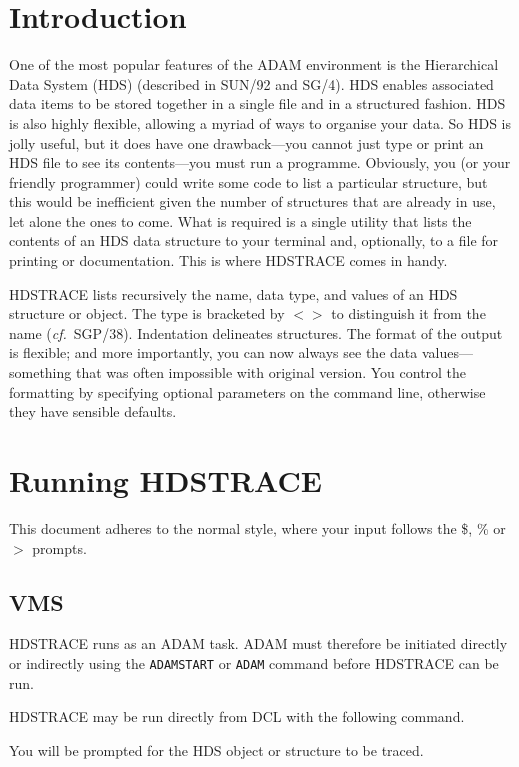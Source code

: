 \documentclass[11pt,nolof]{starlink}
\begin{document}
\scfrontmatter

\section{Introduction}
One of the most popular features of the ADAM environment is the
Hierarchical Data System (HDS) (described in SUN/92 and SG/4).   HDS
enables associated data items to be stored together in a single file and
in a structured fashion.  HDS is also highly flexible, allowing a myriad
of ways to organise your data.  So HDS is jolly useful, but it does have
one drawback---you cannot just type or print an HDS file to see its
contents---you must run a programme.  Obviously, you (or your friendly
programmer) could write some code to list a particular structure, but
this would be inefficient given the number of structures that are
already in use, let alone the ones to come.  What is required is a
single utility that lists the contents of an HDS data structure to your
terminal and, optionally, to a file for printing or documentation. This
is where {\footnotesize HDSTRACE} comes in handy.

{\footnotesize HDSTRACE} lists recursively the name, data type, and
values of an HDS structure or object.  The type is bracketed by $<>$ to
distinguish it from the name (\textit{cf.}\ SGP/38).  Indentation
delineates structures.  The format of the output is flexible; and more
importantly, you can now always see the data values---something that was
often impossible with original version.  You control the formatting by
specifying optional parameters on the command line, otherwise they have
sensible defaults.


\section{Running HDSTRACE}
This document adheres to the normal style, where your input follows
the \$, \% or $>$ prompts.

\subsection{VMS}
{\footnotesize HDSTRACE} runs as an {\footnotesize ADAM} task.
{\footnotesize ADAM} must
therefore be initiated directly or indirectly using the \texttt{ADAMSTART}
or \texttt{ADAM} command before {\footnotesize HDSTRACE} can be run.

{\footnotesize HDSTRACE} may be run directly from DCL with the following
command.
\small
{}
\normalsize
You will be prompted for the HDS object or structure to be traced.
\end{document}
